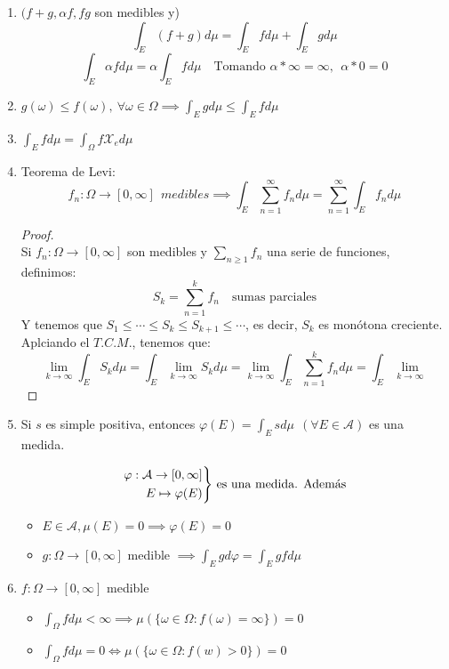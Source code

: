 \documentclass[11pt, a4paper]{article}
\theoremstyle{theorem-style}
\theoremstyle{definition-style}
\theoremstyle{remark-style}
\theoremstyle{example-style}
\newenvironment{nlist}
{\begin{enumerate}
    \renewcommand\labelenumi{(\emph{\roman{enumi})}}}
  {\end{enumerate}}
\newenvironment{rcases}
{\left.\begin{aligned}}
    {\end{aligned}\right\rbrace}
\begin{document}
\begin{nlist}
\item $(f+g, \alpha f, fg $ son medibles y)
  \[
    \int_E (f+g) d\mu = \int_E f d\mu + \int_E g d\mu
  \]
  \[
    \int_E \alpha f d\mu = \alpha \int_E f d\mu \quad \text{Tomando $\alpha *\infty = \infty, \ \ \alpha * 0 = 0$}
  \]
  
\item $g(\omega) \leq f(\omega), \ \forall \omega \in \Omega \implies \int_E g d\mu \leq \int_E f d \mu$
  
\item $\int_E f d \mu =  \int_\Omega f\mathcal{X}_e d\mu$
  
\item Teorema de Levi:
  \[
    f_n: \Omega \to [0,\infty] \ \ medibles \implies \int_E \sum_{n=1}^\infty f_n d \mu = \sum_{n=1}^\infty \int_E f_n d\mu
  \]
  \begin{proof} \hfill \\
    Si $f_n:\Omega \to [0,\infty]$ son medibles y $\sum_{n\geq 1}f_n$ una serie de funciones, definimos:
    \[
      S_k= \sum_{n=1}^k f_n \quad \text{sumas parciales}
    \]
    Y tenemos que $S_1 \leq \cdots \leq S_k \leq S_{k+1} \leq \cdots $, es decir, $S_k$ es monótona creciente. Aplciando el $T.C.M.$, tenemos que:
    \[
      \lim_{k \to \infty} \int_E S_k d\mu = \int_E \lim_{k\to \infty} S_k d\mu = \lim_{k \to \infty} \int_E \sum_{n=1}^k f_n d\mu = \int_E \lim_{k\to \infty }
    \]
    

  \end{proof}
\item Si $s$ es simple positiva, entonces $\varphi(E)= \int_E s d\mu \ \ (\forall E \in \mathcal{A})$ es una medida.
  
  \[
    \begin{rcases}
      \varphi:\mathcal{A} \to [0,\infty] \\
      E \mapsto \varphi(E)
    \end{rcases} \text{ es una medida. Además}
  \]
  \begin{itemize}
  \item $E\in \mathcal{A}, \mu(E) = 0 \implies \varphi(E) = 0$
  \item $g:\Omega \to [0,\infty]$ medible $\implies \int_E g d\varphi = \int_E g f d\mu$
  \end{itemize}

\item $f:\Omega \to [0,\infty]$ medible
  \begin{itemize}
  \item $\int_\Omega f d\mu < \infty \implies \mu(\{\omega \in \Omega: f(\omega) =  \infty\}) = 0$
  \item $\int_\Omega f d\mu = 0 \iff \mu(\{\omega \in \Omega : f(w) > 0\}) = 0$
  \end{itemize}
\end{nlist}
\end{document}
